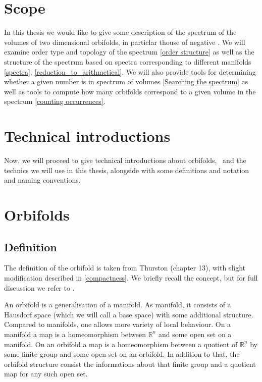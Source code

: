 
\section{Scope}
In this thesis we would like to give some description of the spectrum of the volumes 
of two dimensional orbifolds, in particlar thouse of negative \Eoc. 
We will examine order type and topology of the spectrum \ref{order structure} 
as well as the structure 
of the spectrum based on spectra corresponding to different manifolds \ref{spectra}, 
\ref{reduction_to_arithmetical}.
We will also provide tools for determining whether a given number is in spectrum of volumes 
\ref{Searching the spectrum} as 
well as tools to compute how many orbifolds correspond to a given volume in the spectrum 
\ref{counting occurrences}. 

\section{Technical introductions}
Now, we will proceed to give technical introductions about orbifolds, \Eoc\ and the 
technics we will use in this thesis, alongside with some definitions and notation and 
naming conventions. 
 
\section{Orbifolds}
\subsection{Definition}
The definition of the orbifold is taken from Thurston \cite{Thurston1979} (chapter 13), 
with slight modification described in \ref{compactness}. 
We briefly recall the concept, but for full discussion we refer to \cite{Thurston1979}. 

An orbifold is a generalisation of a manifold. As manifold, it consists of a Hausdorf space 
(which we will call a base space)
with some additional structure. 
Compared to manifolds, one allows more variety of local behaviour. 
On a manifold a map is a homeomorphism between $\mathbb{R}^n$ and some open set on a manifold. 
On an orbifold a map is a homeomorphism between a quotient of $\mathbb{R}^n$ by some 
finite group and some open set on an orbifold. 
In addition to that, the orbifold structure consist the informations about that finite group 
and a quotient map for any such open set. 

